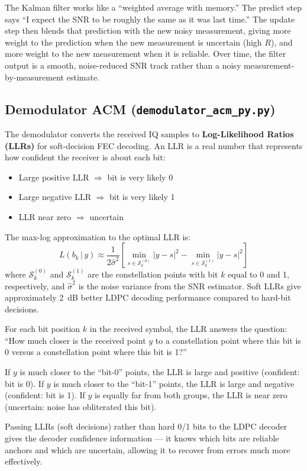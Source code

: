 \documentclass[12pt,a4paper]{report}
\begin{document}
\begin{plainenglish}
The Kalman filter works like a ``weighted average with memory.''  The predict
step says ``I expect the SNR to be roughly the same as it was last time.''  The
update step then blends that prediction with the new noisy measurement, giving
more weight to the prediction when the new measurement is uncertain (high $R$),
and more weight to the new measurement when it is reliable.  Over time, the
filter output is a smooth, noise-reduced SNR track rather than a noisy
measurement-by-measurement estimate.
\end{plainenglish}

\subsection{Demodulator ACM (\texttt{demodulator\_acm\_py.py})}

The demodulator converts the received IQ samples to \textbf{Log-Likelihood
Ratios (LLRs)} for soft-decision FEC decoding. An LLR is a real number that
represents how confident the receiver is about each bit:
\begin{itemize}[nosep]
    \item Large positive LLR $\Rightarrow$ bit is very likely 0
    \item Large negative LLR $\Rightarrow$ bit is very likely 1
    \item LLR near zero $\Rightarrow$ uncertain
\end{itemize}

The max-log approximation to the optimal LLR is:
\begin{equation}
    L(b_k\,|\,y) \approx \frac{1}{2\hat{\sigma}^2}
    \left[\min_{s \in \mathcal{S}_k^{(0)}} |y-s|^2 -
          \min_{s \in \mathcal{S}_k^{(1)}} |y-s|^2\right]
\end{equation}
where $\mathcal{S}_k^{(0)}$ and $\mathcal{S}_k^{(1)}$ are the constellation
points with bit $k$ equal to 0 and 1, respectively, and $\hat{\sigma}^2$ is
the noise variance from the SNR estimator. Soft LLRs give approximately
2~dB better LDPC decoding performance compared to hard-bit decisions.

\begin{plainenglish}
For each bit position $k$ in the received symbol, the LLR answers the question:
``How much closer is the received point $y$ to a constellation point where this
bit is 0 versus a constellation point where this bit is 1?''

If $y$ is much closer to the ``bit-0'' points, the LLR is large and positive
(confident: bit is 0).  If $y$ is much closer to the ``bit-1'' points, the LLR
is large and negative (confident: bit is 1).  If $y$ is equally far from both
groups, the LLR is near zero (uncertain: noise has obliterated this bit).

Passing LLRs (soft decisions) rather than hard 0/1 bits to the LDPC decoder
gives the decoder confidence information --- it knows which bits are reliable
anchors and which are uncertain, allowing it to recover from errors much more
effectively.
\end{plainenglish}
\end{document}
